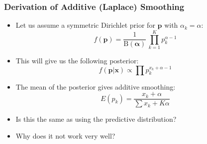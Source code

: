 \documentclass[ignorenonframetext]{beamer}
\begin{document}
\begin{frame}\frametitle{Derivation of Additive (Laplace) Smoothing}
\begin{itemize}
\item Let us assume a symmetric Dirichlet prior for $\mathbf{p}$ with
  $\alpha_k = \alpha$:\[
f(\mathbf{p}) = \frac{1}{\mbox{B}(\boldsymbol{\alpha})}\,
\prod_{k=1}^K p_k^{\alpha-1}
\]

\item This will give us the following posterior: \[
f(\mathbf{p}|\mathbf{x}) \propto \prod p_k^{x_k + \alpha - 1}
\]

\item The mean of the posterior gives additive smoothing:\[
E(p_k) = \frac{x_k + \alpha}{\sum x_k + K\alpha}
\]

\item Is this the same as using the predictive distribution?

\item Why does it not work very well?
\end{itemize}
\end{frame}






\end{document}
